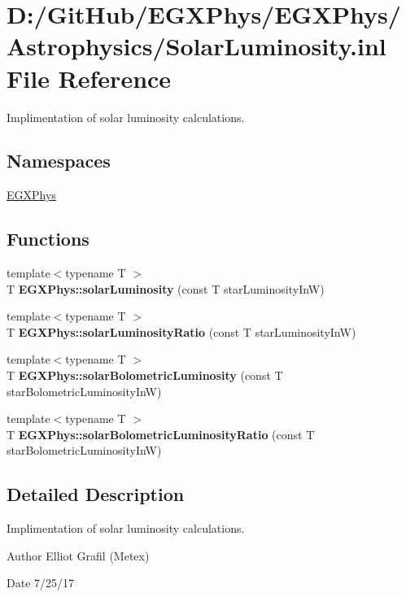 \hypertarget{_solar_luminosity_8inl}{}\section{D\+:/\+Git\+Hub/\+E\+G\+X\+Phys/\+E\+G\+X\+Phys/\+Astrophysics/\+Solar\+Luminosity.inl File Reference}
\label{_solar_luminosity_8inl}


Implimentation of solar luminosity calculations.  


\subsection*{Namespaces}
\begin{DoxyCompactItemize}
\item 
 \mbox{\hyperlink{namespace_e_g_x_phys}{E\+G\+X\+Phys}}
\end{DoxyCompactItemize}
\subsection*{Functions}
\begin{DoxyCompactItemize}
\item 
{\footnotesize template$<$typename T $>$ }\\T {\bfseries E\+G\+X\+Phys\+::solar\+Luminosity} (const T star\+Luminosity\+InW)
\item 
{\footnotesize template$<$typename T $>$ }\\T {\bfseries E\+G\+X\+Phys\+::solar\+Luminosity\+Ratio} (const T star\+Luminosity\+InW)
\item 
{\footnotesize template$<$typename T $>$ }\\T {\bfseries E\+G\+X\+Phys\+::solar\+Bolometric\+Luminosity} (const T star\+Bolometric\+Luminosity\+InW)
\item 
{\footnotesize template$<$typename T $>$ }\\T {\bfseries E\+G\+X\+Phys\+::solar\+Bolometric\+Luminosity\+Ratio} (const T star\+Bolometric\+Luminosity\+InW)
\end{DoxyCompactItemize}


\subsection{Detailed Description}
Implimentation of solar luminosity calculations. 

\begin{DoxyAuthor}{Author}
Elliot Grafil (Metex) 
\end{DoxyAuthor}
\begin{DoxyDate}{Date}
7/25/17 
\end{DoxyDate}
